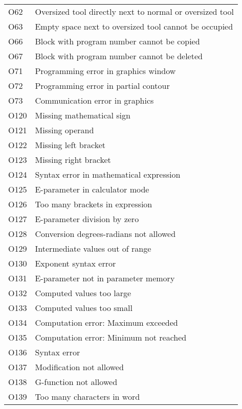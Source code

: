 \documentclass[openany,11pt]{book}
\begin{document}
\begin{table}[!h]
\begin{tabular}{ll}
    O62  & Oversized tool directly next to normal or oversized tool \\
    O63  & Empty space next to oversized tool cannot be occupied \\
    O66  & Block with program number cannot be copied \\
    O67  & Block with program number cannot be deleted \\
    O71  & Programming error in graphics window \\
    O72  & Programming error in partial contour \\
    O73  & Communication error in graphics \\
    O120 & Missing mathematical sign \\
    O121 & Missing operand \\
    O122 & Missing left bracket \\
    O123 & Missing right bracket \\
    O124 & Syntax error in mathematical expression \\
    O125 & E-parameter in calculator mode \\
    O126 & Too many brackets in expression \\
    O127 & E-parameter division by zero \\
    O128 & Conversion degrees-radians not allowed \\
    O129 & Intermediate values out of range \\
    O130 & Exponent syntax error \\
    O131 & E-parameter not in parameter memory \\
    O132 & Computed values too large \\
    O133 & Computed values too small \\
    O134 & Computation error: Maximum exceeded \\
    O135 & Computation error: Minimum not reached \\
    O136 & Syntax error \\
    O137 & Modification not allowed \\
    O138 & G-function not allowed \\
    O139 & Too many characters in word \\
    \end{tabular}
\end{table}

\newpage
\end{document}
